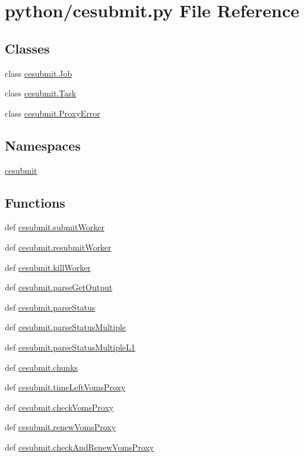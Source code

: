 \section{python/cesubmit.py File Reference}
\label{cesubmit_8py}
\subsection*{Classes}
\begin{DoxyCompactItemize}
\item 
class \hyperlink{classcesubmit_1_1Job}{cesubmit.\-Job}
\item 
class \hyperlink{classcesubmit_1_1Task}{cesubmit.\-Task}
\item 
class \hyperlink{classcesubmit_1_1ProxyError}{cesubmit.\-Proxy\-Error}
\end{DoxyCompactItemize}
\subsection*{Namespaces}
\begin{DoxyCompactItemize}
\item 
\hyperlink{namespacecesubmit}{cesubmit}
\end{DoxyCompactItemize}
\subsection*{Functions}
\begin{DoxyCompactItemize}
\item 
def \hyperlink{namespacecesubmit_abb80ff80fdc177d56f824e38a22e24e5}{cesubmit.\-submit\-Worker}
\item 
def \hyperlink{namespacecesubmit_a6f195d9e0170719ea641a8e4c1779ee5}{cesubmit.\-resubmit\-Worker}
\item 
def \hyperlink{namespacecesubmit_a3c0034bc61b8d04d824ce99d141e7561}{cesubmit.\-kill\-Worker}
\item 
def \hyperlink{namespacecesubmit_ac91881b33d31ee2421f420db0779e105}{cesubmit.\-parse\-Get\-Output}
\item 
def \hyperlink{namespacecesubmit_aef733725d5239bd53cbebad35b6f2fbb}{cesubmit.\-parse\-Status}
\item 
def \hyperlink{namespacecesubmit_af047bf976baeed01419a83aa2c518c17}{cesubmit.\-parse\-Status\-Multiple}
\item 
def \hyperlink{namespacecesubmit_a31adc55fc9847e01b60c6a5d5674c6bb}{cesubmit.\-parse\-Status\-Multiple\-L1}
\item 
def \hyperlink{namespacecesubmit_aeab38202bd4efdfecb032386ccd8daa0}{cesubmit.\-chunks}
\item 
def \hyperlink{namespacecesubmit_a56b28526cc992b27b06992c2d2e4e0fa}{cesubmit.\-time\-Left\-Voms\-Proxy}
\item 
def \hyperlink{namespacecesubmit_ad1499246a43768c1b7dcaa69ac63ebe9}{cesubmit.\-check\-Voms\-Proxy}
\item 
def \hyperlink{namespacecesubmit_a40ba814b5c5329a08c5bf5e9d3ffedf5}{cesubmit.\-renew\-Voms\-Proxy}
\item 
def \hyperlink{namespacecesubmit_a758ea16460878c94db900ede6f582920}{cesubmit.\-check\-And\-Renew\-Voms\-Proxy}
\end{DoxyCompactItemize}
